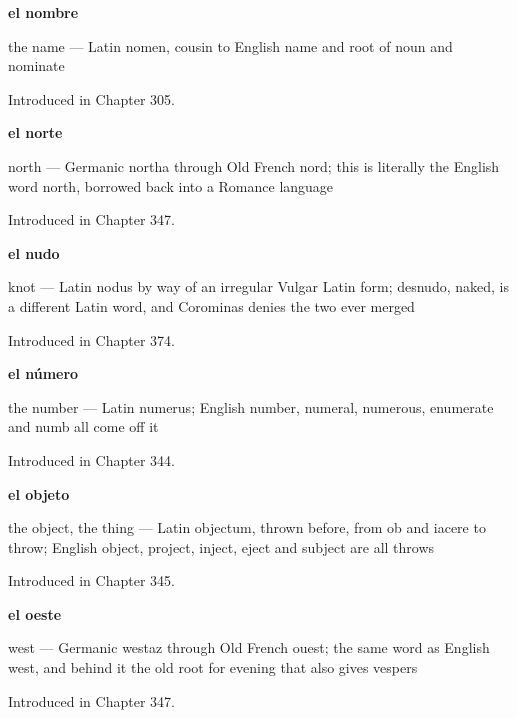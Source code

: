 \noindent\begin{minipage}[t]{\linewidth}
\raggedright
\textbf{el nombre}\par
\small the name — Latin nomen, cousin to English name and root of noun and nominate\par
\footnotesize Introduced in Chapter 305.
\end{minipage}\par\medskip

\noindent\begin{minipage}[t]{\linewidth}
\raggedright
\textbf{el norte}\par
\small north — Germanic northa through Old French nord; this is literally the English word north, borrowed back into a Romance language\par
\footnotesize Introduced in Chapter 347.
\end{minipage}\par\medskip

\noindent\begin{minipage}[t]{\linewidth}
\raggedright
\textbf{el nudo}\par
\small knot — Latin nodus by way of an irregular Vulgar Latin form; desnudo, naked, is a different Latin word, and Corominas denies the two ever merged\par
\footnotesize Introduced in Chapter 374.
\end{minipage}\par\medskip

\noindent\begin{minipage}[t]{\linewidth}
\raggedright
\textbf{el número}\par
\small the number — Latin numerus; English number, numeral, numerous, enumerate and numb all come off it\par
\footnotesize Introduced in Chapter 344.
\end{minipage}\par\medskip

\noindent\begin{minipage}[t]{\linewidth}
\raggedright
\textbf{el objeto}\par
\small the object, the thing — Latin objectum, thrown before, from ob and iacere to throw; English object, project, inject, eject and subject are all throws\par
\footnotesize Introduced in Chapter 345.
\end{minipage}\par\medskip

\noindent\begin{minipage}[t]{\linewidth}
\raggedright
\textbf{el oeste}\par
\small west — Germanic westaz through Old French ouest; the same word as English west, and behind it the old root for evening that also gives vespers\par
\footnotesize Introduced in Chapter 347.
\end{minipage}\par\medskip

